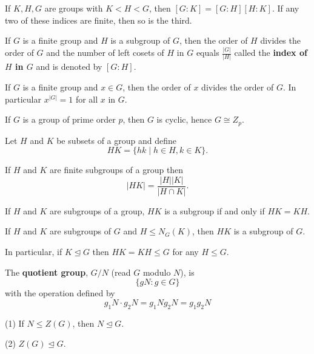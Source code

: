 \begin{theorem}
    If $K, H, G$ are groups with $K<H<G$, then $[G: K]=[G: H][H: K]$.
    If any two of these indices are finite, then so is the third.
\end{theorem}
\begin{theorem}
    If $G$ is a finite group and $H$ is a subgroup of $G$, then the order of $H$ divides the order of $G$ and the number of left cosets of $H$ in $G$ equals $\frac{|G|}{|H|}$ called the \textbf{index of $H$ in $G$} and is denoted by $[G: H]$.
\end{theorem}
\begin{corollary}
    If $G$ is a finite group and $x \in G$, then the order of $x$ divides the order of $G$. In particular $x^{|G|}=1$ for all $x$ in $G$.
\end{corollary}
\begin{corollary}
    If $G$ is a group of prime order $p$, then $G$ is cyclic, hence $G \cong Z_p$.
\end{corollary}
\begin{definition}
    Let $H$ and $K$ be subsets of a group and define
    \[
        H K=\{h k \mid h \in H, k \in K\} .
    \]
\end{definition}
\begin{theorem}
    If $H$ and $K$ are finite subgroups of a group then
    \[
        |H K|=\frac{|H||K|}{|H \cap K|} .
    \]
\end{theorem}


\begin{proposition}
    If $H$ and $K$ are subgroups of a group, $H K$ is a subgroup if and only if $H K=K H$.
\end{proposition}

\begin{corollary}
    If $H$ and $K$ are subgroups of $G$ and $H \leq N_G(K)$, then $H K$ is a subgroup of $G$.

    In particular, if $K \unlhd G$ then $H K =KH \leq G$ for any $H \leq G$.
\end{corollary}





\begin{definition}
    The \textbf{quotient group}, $G / N$ (read $G$ modulo $N$), is
    \[
        \{gN : g\in G\}
    \]
    with the operation defined by
    \[
        g_1N \cdot g_2N
        =
        g_1N  g_2N
        =
        g_1g_2 N
    \]
\end{definition}
\begin{proposition}
    (1) If $N \leq Z(G)$, then $N \unlhd G$.

    (2) $Z(G) \unlhd G$.
\end{proposition}


